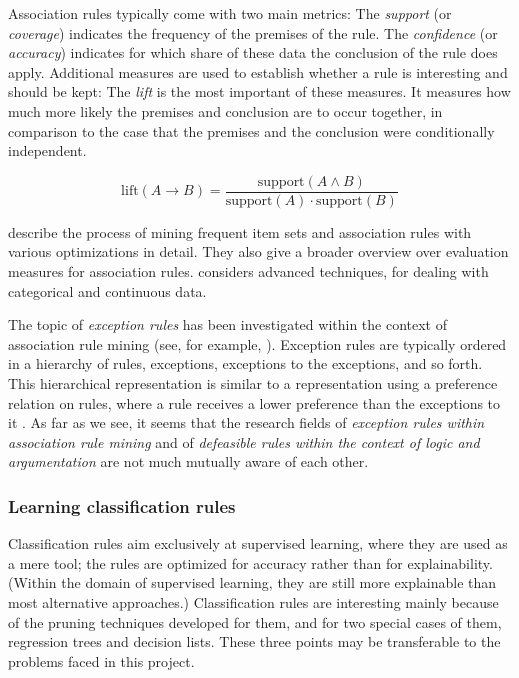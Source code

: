 Association rules typically come with two main metrics: The \textit{support} (or \textit{coverage}) indicates the frequency of the premises of the rule. The \textit{confidence} (or \textit{accuracy}) indicates for which share of these data the conclusion of the rule does apply. Additional measures are used to establish whether a rule is interesting and should be kept: The \textit{lift} is the most important of these measures. It measures how much more likely the premises and conclusion are to occur together, in comparison to the case that the premises and the conclusion were conditionally independent. 

$$\text{lift}(A\rightarrow B)=\frac{\text{support}(A \land B)}{\text{support}(A)\cdot\text{support}(B)}$$

\citet[ch.~6]{tanIntroductionDataMining2014} describe the process of mining frequent item sets and association rules with various optimizations in detail. They also give a broader overview over evaluation measures for association rules. \cite[ch.~7]{tanIntroductionDataMining2014} considers advanced techniques, for dealing with categorical and continuous data. 

The topic of \textit{exception rules} has been investigated within the context of association rule mining (see, for example, \citet{taniarExceptionRulesAssociation2008}). Exception rules are typically ordered in a hierarchy of rules, exceptions, exceptions to the exceptions, and so forth. This hierarchical representation is similar to a representation using a preference relation on rules, where a rule receives a lower preference than the exceptions to it \citep[p.~81f.]{wittenDataMiningPractical2017}. As far as we see, it seems that the research fields of \textit{exception rules within association rule mining} and of \textit{defeasible rules within the context of logic and argumentation} are not much mutually aware of each other.

\subsubsection{Learning classification rules}

Classification rules aim exclusively at supervised learning, where they are used as a mere tool; the rules are optimized for accuracy rather than for explainability. (Within the domain of supervised learning, they are still more explainable than most alternative approaches.) Classification rules are interesting mainly because of the pruning techniques developed for them, and for two special cases of them, regression trees and decision lists. These three points may be transferable to the problems faced in this project. 


